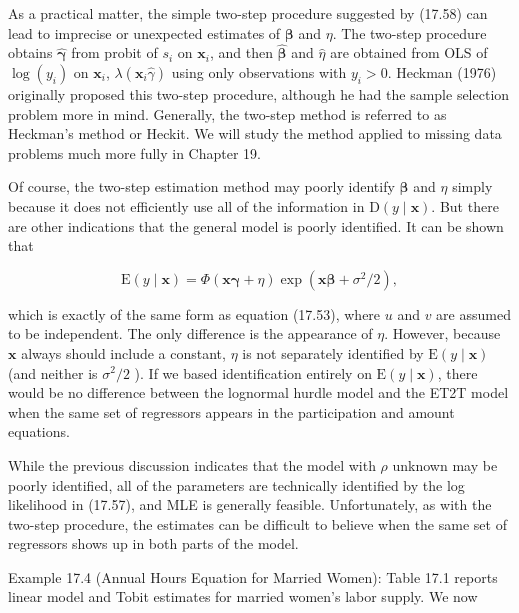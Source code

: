 \documentclass[10pt]{article}
\begin{document}
As a practical matter, the simple two-step procedure suggested by (17.58) can lead to imprecise or unexpected estimates of $\boldsymbol{\beta}$ and $\eta$. The two-step procedure obtains $\hat{\boldsymbol{\gamma}}$ from probit of $s_{i}$ on $\mathbf{x}_{i}$, and then $\hat{\boldsymbol{\beta}}$ and $\hat{\eta}$ are obtained from OLS of $\log \left(y_{i}\right)$ on $\mathbf{x}_{i}$, $\lambda\left(\mathbf{x}_{i} \hat{\gamma}\right)$ using only observations with $y_{i}>0$. Heckman (1976) originally proposed this two-step procedure, although he had the sample selection problem more in mind. Generally, the two-step method is referred to as Heckman's method or Heckit. We will study the method applied to missing data problems much more fully in Chapter 19.

Of course, the two-step estimation method may poorly identify $\boldsymbol{\beta}$ and $\eta$ simply because it does not efficiently use all of the information in $\mathrm{D}(y \mid \mathbf{x})$. But there are other indications that the general model is poorly identified. It can be shown that


\begin{equation*}
\mathrm{E}(y \mid \mathbf{x})=\Phi(\mathbf{x} \boldsymbol{\gamma}+\eta) \exp \left(\mathbf{x} \boldsymbol{\beta}+\sigma^{2} / 2\right), \tag{17.59}
\end{equation*}


which is exactly of the same form as equation (17.53), where $u$ and $v$ are assumed to be independent. The only difference is the appearance of $\eta$. However, because $\mathbf{x}$ always should include a constant, $\eta$ is not separately identified by $\mathrm{E}(y \mid \mathbf{x})$ (and neither is $\sigma^{2} / 2$ ). If we based identification entirely on $\mathrm{E}(y \mid \mathbf{x})$, there would be no difference between the lognormal hurdle model and the ET2T model when the same set of regressors appears in the participation and amount equations.

While the previous discussion indicates that the model with $\rho$ unknown may be poorly identified, all of the parameters are technically identified by the log likelihood in (17.57), and MLE is generally feasible. Unfortunately, as with the two-step procedure, the estimates can be difficult to believe when the same set of regressors shows up in both parts of the model.

Example 17.4 (Annual Hours Equation for Married Women): Table 17.1 reports linear model and Tobit estimates for married women's labor supply. We now
\end{document}
